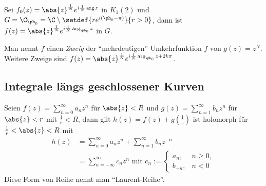 \addtocounter{prop}{2}

\begin{bsp}
\label{bsp:2.78}
Sei $f_0(z) = \abs{z}^{\frac{1}{N}}e^{i\frac{1}{N}\arg z}$ in $K_1(2)$ und
$G=\C_{\ph_0} = \C\setminus\setdef{re^{i(\ph_0-\pi)}}{r>0}$, dann ist 
$f(z) = \abs{z}^{\frac{1}{N}}e^{i\frac{1}{N}\arg_{\ph_0} z}$ in $G$.

Man nennt $f$ einen \emph{Zweig} der ``mehrdeutigen'' Umkehrfunktion $f$ von
$g(z) = z^N$. Weitere Zweige sind $f(z) =
\abs{z}^{\frac{1}{N}}e^{i\frac{1}{N}\arg_{\ph_0} z + 2k\pi}$.\bsphere
\end{bsp}

\subsection{Integrale längs geschlossener Kurven}

\begin{bsp}
\label{bsp:2.79}
Seien $f(z) = \sum\limits_{n=0}^\infty a_n z^n$ für $\abs{z}<R$ und $g(z) =
\sum\limits_{n=1}^\infty b_n z^n$ für $\abs{z}<r$ mit $\frac{1}{r}<R$, dann gilt
$h(z) = f(z) + g(\frac{1}{z})$ ist holomorph für $\frac{1}{r}<\abs{z}<R$ mit
\begin{align*}
h(z) &= \sum\limits_{n=0}^\infty a_n z^n + \sum\limits_{n=1}^\infty b_nz^{-n}
\\& = \sum\limits_{n=-\infty}^\infty c_nz^n\text{ mit } c_n :=\begin{cases}
a_n,& n\ge 0,\\
b_{-n},& n< 0
\end{cases}
\end{align*}
Diese Form von Reihe nennt man ``Laurent-Reihe''.\bsphere
\end{bsp}

